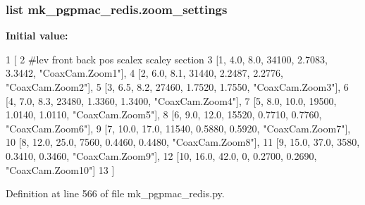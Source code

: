 \hypertarget{namespacemk__pgpmac__redis_ad91bac9be746f99e1cf1f8e28ff348be}{
\subsubsection[{zoom\-\_\-settings}]{\setlength{\rightskip}{0pt plus 5cm}list mk\-\_\-pgpmac\-\_\-redis.\-zoom\-\_\-settings}}\label{namespacemk__pgpmac__redis_ad91bac9be746f99e1cf1f8e28ff348be}
{\bfseries Initial value\-:}
\begin{DoxyCode}
1 [
2     \textcolor{comment}{#lev   front  back  pos     scalex  scaley   section}
3     [1,     4.0,   8.0,  34100, 2.7083,  3.3442, \textcolor{stringliteral}{"CoaxCam.Zoom1"}],
4     [2,     6.0,   8.1,  31440, 2.2487,  2.2776, \textcolor{stringliteral}{"CoaxCam.Zoom2"}],
5     [3,     6.5,   8.2,  27460, 1.7520,  1.7550, \textcolor{stringliteral}{"CoaxCam.Zoom3"}],
6     [4,     7.0,   8.3,  23480, 1.3360,  1.3400, \textcolor{stringliteral}{"CoaxCam.Zoom4"}],
7     [5,     8.0,  10.0,  19500, 1.0140,  1.0110, \textcolor{stringliteral}{"CoaxCam.Zoom5"}],
8     [6,     9.0,  12.0,  15520, 0.7710,  0.7760, \textcolor{stringliteral}{"CoaxCam.Zoom6"}],
9     [7,    10.0,  17.0,  11540, 0.5880,  0.5920, \textcolor{stringliteral}{"CoaxCam.Zoom7"}],
10     [8,    12.0,  25.0,   7560, 0.4460,  0.4480, \textcolor{stringliteral}{"CoaxCam.Zoom8"}],
11     [9,    15.0,  37.0,   3580, 0.3410,  0.3460, \textcolor{stringliteral}{"CoaxCam.Zoom9"}],
12     [10,   16.0,  42.0,      0, 0.2700,  0.2690, \textcolor{stringliteral}{"CoaxCam.Zoom10"}]
13     ]
\end{DoxyCode}


Definition at line 566 of file mk\-\_\-pgpmac\-\_\-redis.\-py.

